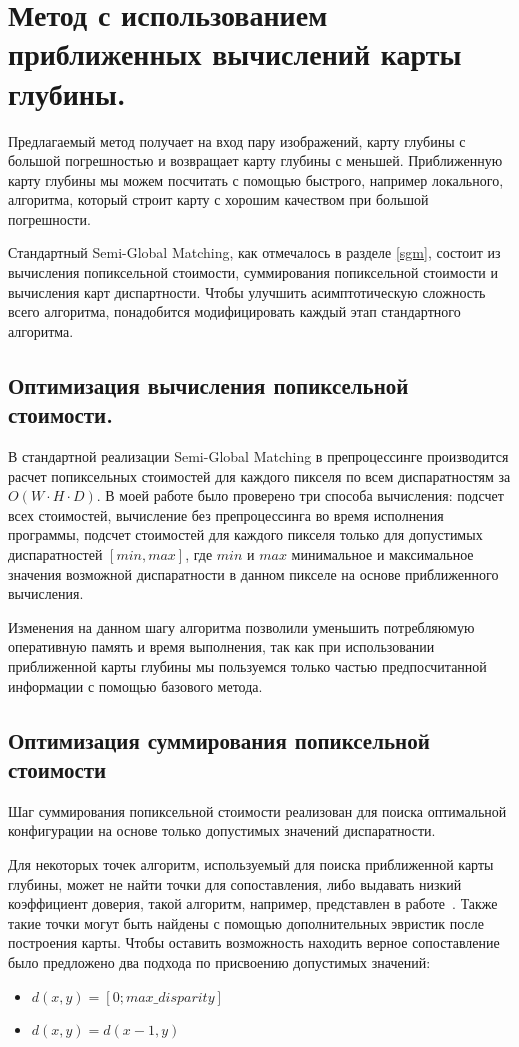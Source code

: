 \section{Метод с использованием приближенных вычислений карты глубины.}

Предлагаемый метод получает на вход пару изображений, карту глубины с большой погрешностью и возвращает карту глубины с меньшей. Приближенную карту глубины мы можем посчитать с помощью быстрого, например локального, алгоритма, который строит карту с хорошим качеством при большой погрешности. 

Стандартный Semi-Global Matching, как отмечалось в разделе \ref{sgm}, состоит из вычисления попиксельной стоимости, суммирования попиксельной стоимости и вычисления карт диспартности. Чтобы улучшить асимптотическую сложность всего алгоритма, понадобится модифицировать каждый этап стандартного алгоритма.

\subsection{Оптимизация вычисления попиксельной стоимости.}
В стандартной реализации Semi-Global Matching в препроцессинге производится расчет попиксельных стоимостей для каждого пикселя по всем диспаратностям за $O ( W \cdot H \cdot D)$. В моей работе было проверено три способа вычисления: подсчет всех стоимостей, вычисление без препроцессинга во время исполнения программы, подсчет стоимостей для каждого пикселя только для допустимых диспаратностей $[min, max]$, где $min$ и $max$  минимальное и максимальное значения возможной диспаратности в данном пикселе на основе приближенного вычисления.

Изменения на данном шагу алгоритма позволили уменьшить потребляюмую оперативную память и время выполнения, так как при использовании приближенной карты глубины мы пользуемся только частью предпосчитанной информации с помощью базового метода.

\subsection{Оптимизация суммирования попиксельной стоимости}
Шаг суммирования попиксельной стоимости реализован для поиска оптимальной конфигурации на основе только допустимых значений диспаратности.

Для некоторых точек алгоритм, используемый для поиска приближенной карты глубины, может не найти точки для сопоставления, либо выдавать низкий коэффициент доверия, такой алгоритм, например, представлен в работе~\cite{esgm}. Также такие точки могут быть найдены с помощью дополнительных эвристик после построения карты. Чтобы оставить возможность находить верное сопоставление было предложено два подхода по присвоению допустимых значений:
\begin{itemize}
\item $d(x,y) = [0; max\_disparity]$
\item $d(x, y) = d(x - 1, y)$
\end{itemize}

